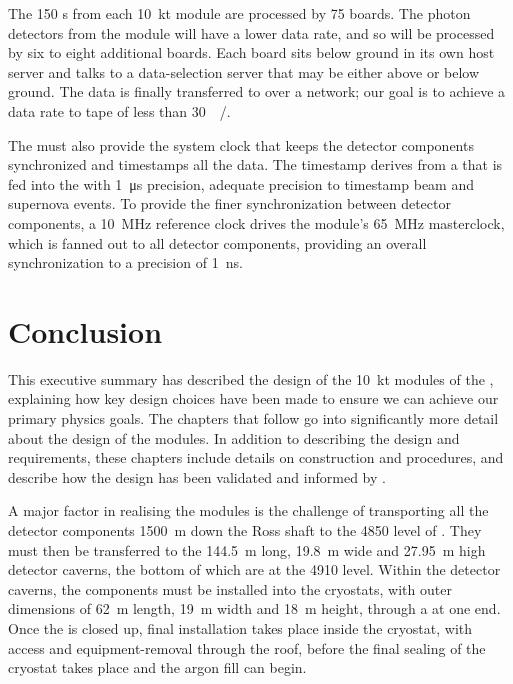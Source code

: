 The 150 s from each \SI{10}{\kilo\tonne} module are processed by 75  boards. The photon detectors from the module will have a lower data rate, and so will be processed by six to eight additional  boards. Each  board sits below ground in its own host server and talks to a data-selection server that may be either above or below ground. The data is finally transferred to  over a network; our goal is to achieve a data rate to tape of less than \SI{30}{\peta\byte/\year}.

The  must also provide the system clock that keeps the detector components synchronized and timestamps all the data. The timestamp derives from a   that is fed into the  with \SI{1}{\micro\second} precision, adequate precision to timestamp beam and supernova events. To provide the finer synchronization between detector components, a \SI{10}{\mega\hertz} reference clock drives the module's \SI{65}{\mega\hertz} masterclock, which is fanned out to all detector components, providing an overall synchronization to a precision of \SI{1}{\nano\second}.


\section{Conclusion}
\label{sec:fdsp-exec-conclusion}

This executive summary has described the design of the \SI{10}{\kilo\tonne}   modules of the  , explaining how key design choices have been made to ensure we can achieve our primary physics goals. The chapters that follow go into significantly more detail about the design of the   modules. In addition to describing the design and requirements, these chapters include details on construction and  procedures, and describe how the design has been validated and informed by .

A major factor in realising the   modules is the challenge of transporting all the detector components \SI{1500}{\meter} down the Ross shaft to the \SI{4850}{\foot} level of . They must then be transferred to the \SI{144.5}{\meter} long, \SI{19.8}{\meter} wide and \SI{27.95}{\meter} high detector caverns, the bottom of which are at the \SI{4910}{\foot} level. Within the detector caverns, the components must be installed into the cryostats, with outer dimensions of \SI{62}{\meter} length, \SI{19}{\meter} width and \SI{18}{\meter} height, through a  at one end. Once the  is closed up, final installation takes place inside the cryostat, with access and equipment-removal through the roof, before the final sealing of the cryostat takes place and the argon fill can begin.


